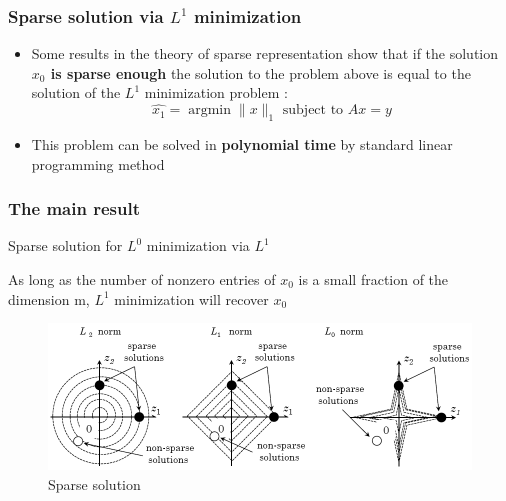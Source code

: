 \documentclass{beamer}
\DeclareMathOperator{\argmin}{argmin} %
\begin{document}
\begin{frame}

		\frametitle{Sparse solution via  $L^{1}$ minimization}		
			
\begin{itemize}
\item Some results in the theory of sparse representation show that if the solution \textbf{$x_{0}$ is sparse enough} the solution to the problem above is equal to the solution of the $L^{1 }$ minimization problem :
	$$ \hat{x_{1}}= \argmin \|x\|_{1}  \mbox{ subject to } Ax=y$$
	
\item This problem can be solved in \textbf{polynomial time} by standard linear programming method

\end{itemize}

\end{frame}



		
\begin{frame}

		\frametitle{The main result}		
			
\begin{block}{Sparse solution for $L^{0}$ minimization via $L^{1}$}

As long as the number of nonzero entries of $x_{0}$ is a small fraction of the dimension m, $L^{1}$ minimization will recover $x_{0}$ 

\end{block}

			\begin{figure}[!ht]
			\begin{center}
			\includegraphics[scale=0.45]{sparse_sol.png}
			\end{center}
			\caption{Sparse solution}
			\label{fa}
			\end{figure}

\end{frame}
\end{document}
